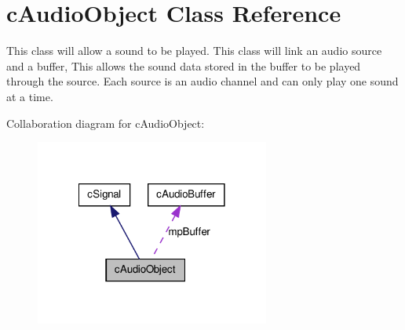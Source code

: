 \hypertarget{classc_audio_object}{
\section{cAudioObject Class Reference}
\label{classc_audio_object}
}


This class will allow a sound to be played. This class will link an audio source and a buffer, This allows the sound data stored in the buffer to be played through the source. Each source is an audio channel and can only play one sound at a time.  




Collaboration diagram for cAudioObject:\nopagebreak
\begin{figure}[H]
\begin{center}
\leavevmode
\includegraphics[width=218pt]{classc_audio_object__coll__graph}
\end{center}
\end{figure}
